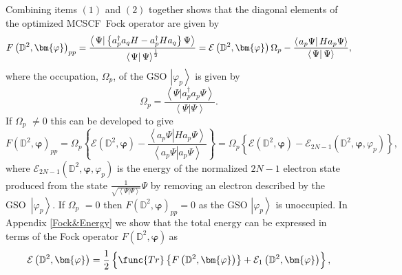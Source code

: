 \documentclass{preprint}
\begin{document}
Combining items $\left( 1\right) $ and $\left( 2\right) $ together shows
that the diagonal elements of the optimized MCSCF\ Fock operator are given
by
\begin{equation}
F\left( \mathbb{D}^{2},\bm{\varphi}\right) _{pp}=\frac{\left\langle \left.
\Psi\right\vert \left\{ a_{p}^{\dagger}a_{q}H-a_{p}^{\dagger}Ha_{q}\right\}
\Psi\right\rangle }{\left\langle \left. \Psi\right\vert \Psi\right\rangle ^{%
\frac{1}{2}}}=\mathcal{E}\left( \mathbb{D}^{2},\bm{\varphi}\right)
\Omega_{p}-\frac{\left\langle \left. a_{p}\Psi\right\vert
Ha_{p}\Psi\right\rangle }{\left\langle \left. \Psi\right\vert
\Psi\right\rangle },
\end{equation}
where the occupation, $\Omega_{p}$, of the GSO $\left\vert \varphi
_{p}\right\rangle $ is given by
\begin{equation}
\Omega_{p}=\frac{\left\langle \left. \Psi\right\vert
a_{p}^{\dagger}a_{p}\Psi\right\rangle }{\left\langle \left. \Psi\right\vert
\Psi\right\rangle }.
\end{equation}
If $\Omega_{p}$ $\neq0$ this can be developed to give
\begin{equation}
F\left( \mathbb{D}^{2},\bm{\varphi}\right) _{pp}=\Omega_{p}\left\{ \mathcal{E%
}\left( \mathbb{D}^{2},\bm{\varphi}\right) -\frac{\left\langle \left.
a_{p}\Psi\right\vert Ha_{p}\Psi\right\rangle }{\left\langle \left.
a_{p}\Psi\right\vert a_{p}\Psi\right\rangle }\right\} =\Omega_{p}\left\{
\mathcal{E}\left( \mathbb{D}^{2},\bm{\varphi}\right) -\mathcal{E}%
_{2N-1}\left( \mathbb{D}^{2},\bm{\varphi,}\varphi_{p}\right) \right\} ,
\end{equation}
where $\mathcal{E}_{2N-1}\left( \mathbb{D}^{2},\bm{\varphi,}\varphi
_{p}\right) $ is the energy of the normalized $2N-1$ electron state produced
from the state $\frac{1}{\sqrt{\left\langle \left. \Psi\right\vert
\Psi\right\rangle }}\Psi$ by removing an electron described by the GSO\ $%
\left\vert \varphi_{p}\right\rangle $. If $\Omega_{p}$ $=0$ then $F\left(
\mathbb{D}^{2},\bm{\varphi}\right) _{pp}=0$ as the GSO $\left\vert
\varphi_{p}\right\rangle $ is unoccupied. In Appendix \ref{Fock&Energy} we
show that the total energy can be expressed in terms of the Fock operator $%
F\left( \mathbb{D}^{2},\bm{\varphi}\right) \ $as
\begin{equation}
\mathcal{E}\left( \mathbb{D}^{2},\bm{\varphi}\right) =\frac{1}{2}\left\{
\overset{}{\func{Tr}\left\{ F\left( \mathbb{D}^{2},\bm{\varphi}\right)
\right\} +\mathcal{E}_{1}\left( \mathbb{D}^{2},\bm{\varphi}\right) }\right\}
,
\end{equation}
\end{document}
